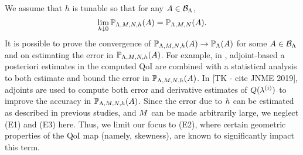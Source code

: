 We assume that $h$ is tunable so that for any $A\in \mathcal{B}_{{\Lambda}}$,
\[
\lim\limits_{h \downarrow 0} \mathbb{P}_{{\Lambda}, M, N, h} (A) = \mathbb{P}_{{\Lambda}, M, N} (A).
\]
It is possible to prove the convergence of $\mathbb{P}_{{\Lambda}, M, N, h} (A) \to \mathbb{P}_{\Lambda} (A)$ for some $A\in \mathcal{B}_{{\Lambda}}$ and on estimating the error in $\mathbb{P}_{{\Lambda}, M, N, h}(A)$.
For example, in \cite{BGE+15}, adjoint-based a posteriori estimates in the computed QoI are combined with a statistical analysis to both estimate and bound the error in $\mathbb{P}_{{\Lambda}, M, N, h} (A)$.
In [TK - cite JNME 2019], adjoints are used to compute both error and derivative estimates of $Q(\lambda^{(i)})$ to improve the accuracy in $\mathbb{P}_{{\Lambda}, M, N, h} (A)$.
Since the error due to $h$ can be estimated as described in previous studies, and $M$ can be made arbitrarily large, we neglect (E1) and (E3) here.
Thus, we limit our focus to (E2), where certain geometric properties of the QoI map (namely, skewness), are known to significantly impact this term.

\FloatBarrier
